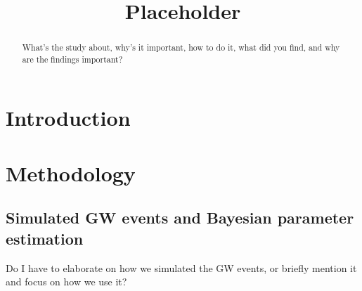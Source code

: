 \documentclass[linenumbers,amsmath,trackchanges]{aastex702}
\begin{document}
\title{Placeholder}




\begin{abstract}
What's the study about, why's it important, how to do it, what did you find, and why are the findings 
important?\\
\end{abstract}



\section{Introduction}

\section{Methodology}
\subsection{Simulated GW events and Bayesian parameter estimation}
Do I have to elaborate on how we simulated the GW events, or briefly mention it and focus on how we use it?
\end{document}
